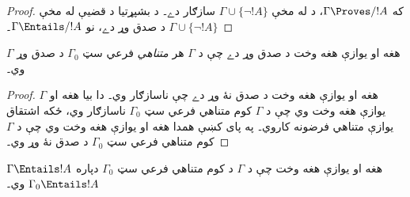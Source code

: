 \documentclass[../../../include/open-logic-section]{subfiles}
\begin{document}
\begin{proof}
که $\Gamma\Proves/ !A$، د  له مخې $\Gamma \cup \{\lnot !A\}$ سازګار دے۔ د بشپړتيا د قضيې له مخې $\Gamma \cup
\{\lnot !A\}$ د صدق وړ دے، نو $\Gamma \Entails/ !A$۔
\end{proof}

\begin{prop}
$\Gamma$ هغه او يوازې هغه وخت د صدق وړ دے چې د $\Gamma$ هر \emph{متناهي} فرعي سټ $\Gamma_0$ د صدق وړ وي۔
\end{prop}

\begin{proof}
$\Gamma$ هغه او يوازې هغه وخت د صدق نۀ وړ دے چې ناسازګار وي۔ دا بيا هغه او يوازې هغه وخت وي چې د $\Gamma$ کوم متناهي فرعي سټ $\Gamma_0$ ناسازګار وي، ځکه اشتقاق يوازې متناهي فرضونه کاروي۔ په پای کښې همدا هغه او يوازې هغه وخت وي چې د $\Gamma$ کوم متناهي فرعي سټ $\Gamma_0$ د صدق نۀ وړ وي۔
\end{proof}

\begin{cor}
$\Gamma \Entails !A$ هغه او يوازې هغه وخت چې د $\Gamma$ د کوم متناهي فرعي سټ $\Gamma_0$ دپاره $\Gamma_0 \Entails !A$ وي۔
\end{cor}
\end{document}
